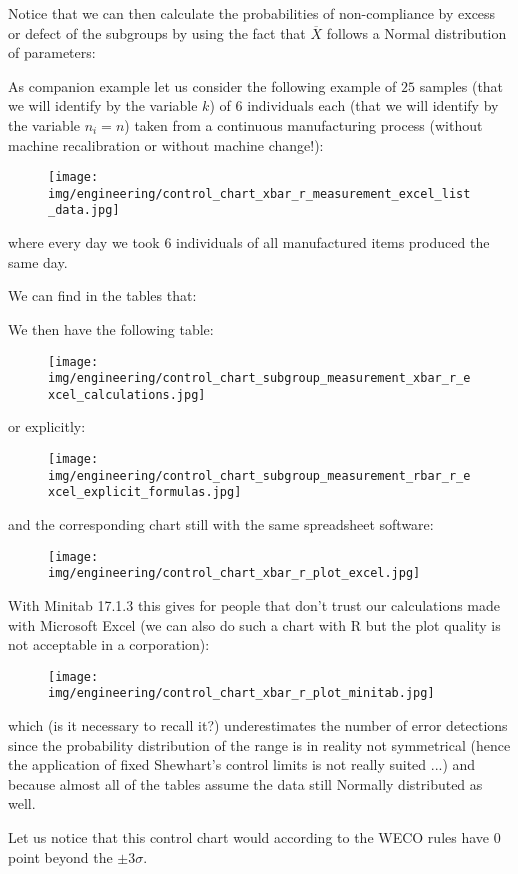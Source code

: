 	Notice that we can then calculate the probabilities of non-compliance by excess or defect of the subgroups by using the fact that $\overline{X}$ follows a Normal distribution of parameters:
	
	
	As companion example let us consider the following example of $25$ samples (that we will identify by the variable $k$) of $6$ individuals each (that we will identify by the variable $n_i=n$) taken from a continuous manufacturing process (without machine recalibration or without machine change!):
	\begin{figure}[H]
		\centering
		\texttt{[image: img/engineering/control\_chart\_xbar\_r\_measurement\_excel\_list\_data.jpg]}
	\end{figure}
	where every day we took $6$ individuals of all manufactured items produced the same day.
	
	We can find in the tables that:
	
	We then have the following table:
	\begin{figure}[H]
		\centering
		\texttt{[image: img/engineering/control\_chart\_subgroup\_measurement\_xbar\_r\_excel\_calculations.jpg]}
	\end{figure}
	or explicitly:
	\begin{figure}[H]
		\centering
		\texttt{[image: img/engineering/control\_chart\_subgroup\_measurement\_rbar\_r\_excel\_explicit\_formulas.jpg]}
	\end{figure}
	and the corresponding chart still with the same spreadsheet software:
	\begin{figure}[H]
		\centering
		\texttt{[image: img/engineering/control\_chart\_xbar\_r\_plot\_excel.jpg]}
	\end{figure}
	With Minitab 17.1.3 this gives for people that don't trust our calculations made with Microsoft Excel (we can also do such a chart with R but the plot quality is not acceptable in a corporation):
	\begin{figure}[H]
		\centering
		\texttt{[image: img/engineering/control\_chart\_xbar\_r\_plot\_minitab.jpg]}
	\end{figure}
	which (is it necessary to recall it?) underestimates the number of error detections since the probability distribution of the range is in reality not symmetrical (hence the application of fixed Shewhart's control limits is not really suited ...) and because almost all of the tables assume the data still Normally distributed as well.
	
	Let us notice that this control chart would according to the WECO rules have $0$ point beyond the $\pm 3\sigma$.
	
